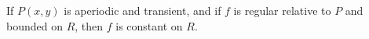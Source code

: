 If \(P(x,y)\) is aperiodic and transient, and if \(f\) is regular relative to \(P\) and bounded on \(R\), then \(f\) is constant on \(R\).
